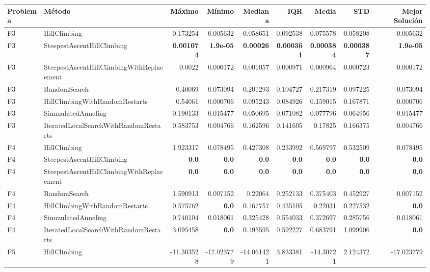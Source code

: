 \begin{tabular}{llrrrrrrr}
\toprule
Problema & Método & Máximo & Mínimo & Mediana & IQR & Media & STD & Mejor Solución \\ 
\midrule
F3 & HillClimbing & 0.173254 & 0.005632 & 0.058651 & 0.092538 & 0.075578 & 0.058208 & 0.005632 \\ 
F3 & SteepestAscentHillClimbing & \textbf{0.001074} & \textbf{1.9e-05} & \textbf{0.00026} & \textbf{0.000361} & \textbf{0.000384} & \textbf{0.000387} & \textbf{1.9e-05} \\ 
F3 & SteepestAscentHillClimbingWithReplacement & 0.0022 & 0.000172 & 0.001057 & 0.000971 & 0.000964 & 0.000723 & 0.000172 \\ 
F3 & RandomSearch & 0.40069 & 0.073094 & 0.201293 & 0.104727 & 0.217319 & 0.097225 & 0.073094 \\ 
F3 & HillClimbingWithRandomRestarts & 0.54061 & 0.000706 & 0.095243 & 0.084926 & 0.159015 & 0.167871 & 0.000706 \\ 
F3 & SimmulatedAnneling & 0.190133 & 0.015477 & 0.050695 & 0.071082 & 0.077796 & 0.064956 & 0.015477 \\ 
F3 & IteratedLocalSearchWithRandomRestarts & 0.583753 & 0.004766 & 0.162596 & 0.141605 & 0.17825 & 0.166375 & 0.004766 \\ 
F4 & HillClimbing & 1.923317 & 0.078495 & 0.427308 & 0.233992 & 0.569797 & 0.532509 & 0.078495 \\ 
F4 & SteepestAscentHillClimbing & \textbf{0.0} & \textbf{0.0} & \textbf{0.0} & \textbf{0.0} & \textbf{0.0} & \textbf{0.0} & \textbf{0.0} \\ 
F4 & SteepestAscentHillClimbingWithReplacement & \textbf{0.0} & \textbf{0.0} & \textbf{0.0} & \textbf{0.0} & \textbf{0.0} & \textbf{0.0} & \textbf{0.0} \\ 
F4 & RandomSearch & 1.590913 & 0.007152 & 0.22064 & 0.252133 & 0.375403 & 0.452927 & 0.007152 \\ 
F4 & HillClimbingWithRandomRestarts & 0.575762 & \textbf{0.0} & 0.167757 & 0.435105 & 0.22031 & 0.227532 & \textbf{0.0} \\ 
F4 & SimmulatedAnneling & 0.740104 & 0.018061 & 0.325428 & 0.554033 & 0.372697 & 0.285756 & 0.018061 \\ 
F4 & IteratedLocalSearchWithRandomRestarts & 3.095458 & \textbf{0.0} & 0.195595 & 0.592227 & 0.683791 & 1.099906 & \textbf{0.0} \\ 
F5 & HillClimbing & -11.303528 & -17.023779 & -14.061421 & 3.833381 & -14.30721 & 2.124372 & -17.023779 \\ 

\end{tabular}
